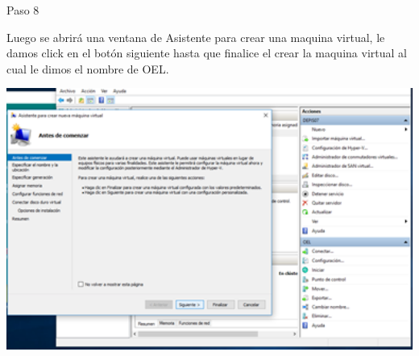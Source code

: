 \begin{itemize}
\begin{center}
    Paso 8
\end{center}


    Luego se abrirá una ventana de Asistente para crear una maquina virtual, le damos click en el botón siguiente hasta que finalice el crear la maquina virtual al cual le dimos el nombre de OEL.\\
	\begin{center}
	\includegraphics[width=15cm]{./Imagenes/imagen8} 
	\end{center}


\end{itemize} 



  
  
  

